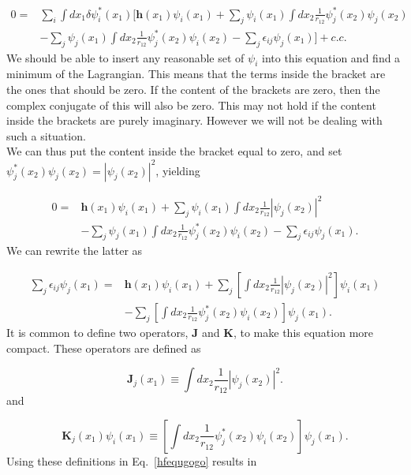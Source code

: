 \documentclass[a4paper,norsk,11pt,twoside]{report}
\begin{document}
\begin{align}
0 = & \sum_i \int dx_1 \delta \psi_i^*(x_1) 
\Big[
\textbf{h}(x_1) \psi_i(x_1)
+ \sum_j \psi_i(x_1) 
\int dx_2
\frac{1}{r_{12}} \psi_j^*(x_2) \psi_j(x_2)
\nonumber \\ &
- \sum_j \psi_j(x_1) \int dx_2 \frac{1}{r_{12}} \psi_j^*(x_2) \psi_i(x_2)
- \sum_j \epsilon_{ij} \psi_j(x_1)
\Big]
+ c.c .
\end{align}
We should be able to insert any reasonable set of $\psi_i$ into this equation
and find a minimum of the Lagrangian. This means that the terms inside the
bracket are the ones that should be zero. If the content of the
brackets are zero, then the complex conjugate of this will also be
zero. This may not hold if the content inside the brackets are purely
imaginary. However we will not be dealing with such a situation. \\

We can thus put the content inside the bracket equal to zero, and set
$\psi_j^*(x_2) \psi_j(x_2) = |\psi_j(x_2)|^2$, yielding

\begin{align}
0 = &
\textbf{h}(x_1) \psi_i(x_1)
+ \sum_j \psi_i(x_1) 
\int dx_2
\frac{1}{r_{12}} |\psi_j(x_2)|^2
\nonumber \\ &
- \sum_j \psi_j(x_1) \int dx_2 \frac{1}{r_{12}} \psi_j^*(x_2) \psi_i(x_2)
- \sum_j \epsilon_{ij} \psi_j(x_1) .
\end{align}
We can rewrite the latter as

\begin{align}
\sum_j \epsilon_{ij} \psi_j(x_1) = &
\textbf{h}(x_1) \psi_i(x_1)
+ \sum_j \left[ 
\int dx_2
\frac{1}{r_{12}} |\psi_j(x_2)|^2
\right]
\psi_i(x_1)
\nonumber \\ &
- \sum_j \left[ \int dx_2 \frac{1}{r_{12}} \psi_j^*(x_2) \psi_i(x_2) \right] \psi_j(x_1) .
\label{hfequgogo}
\end{align}
It is common to define two operators, $\textbf{J}$ and $\textbf{K}$, to make this equation more compact. 
These operators are defined as 

\begin{equation}
\textbf{J}_j(x_1) \equiv \int dx_2
\frac{1}{r_{12}} |\psi_j(x_2)|^2 . \label{JJdefinition}
\end{equation}
and

\begin{equation}
\textbf{K}_j(x_1) \psi_i(x_1) \equiv 
\left[ \int dx_2 \frac{1}{r_{12}} \psi_j^*(x_2) \psi_i(x_2) \right] \psi_j(x_1) .
\label{KKdefinition}
\end{equation}
Using these definitions in   Eq.~\eqref{hfequgogo} results in
\end{document}
